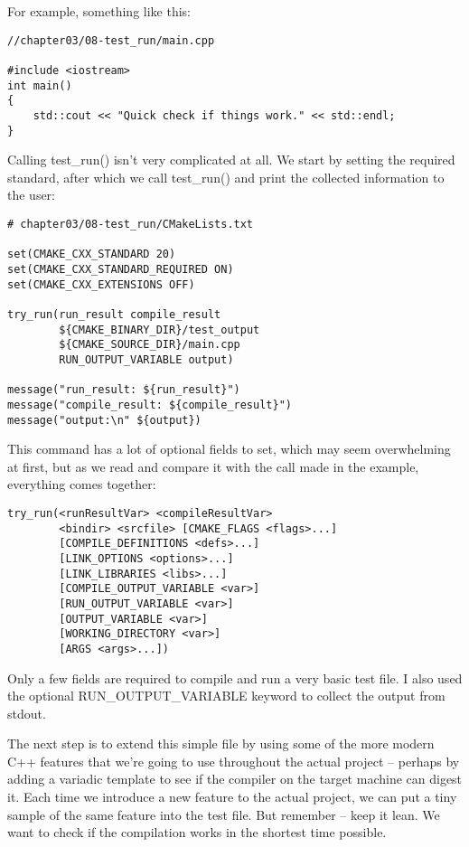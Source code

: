 For example, something like this:

\begin{lstlisting}[style=styleCXX]
//chapter03/08-test_run/main.cpp

#include <iostream>
int main()
{
	std::cout << "Quick check if things work." << std::endl;
}
\end{lstlisting}

Calling test\_run() isn't very complicated at all. We start by setting the required standard, after which we call test\_run() and print the collected information to the user:

\begin{lstlisting}[style=styleCMake]
# chapter03/08-test_run/CMakeLists.txt

set(CMAKE_CXX_STANDARD 20)
set(CMAKE_CXX_STANDARD_REQUIRED ON)
set(CMAKE_CXX_EXTENSIONS OFF)

try_run(run_result compile_result
		${CMAKE_BINARY_DIR}/test_output
		${CMAKE_SOURCE_DIR}/main.cpp
		RUN_OUTPUT_VARIABLE output)
		
message("run_result: ${run_result}")
message("compile_result: ${compile_result}")
message("output:\n" ${output})
\end{lstlisting}

This command has a lot of optional fields to set, which may seem overwhelming at first, but as we read and compare it with the call made in the example, everything comes together:

\begin{lstlisting}[style=styleCMake]
try_run(<runResultVar> <compileResultVar>
		<bindir> <srcfile> [CMAKE_FLAGS <flags>...]
		[COMPILE_DEFINITIONS <defs>...]
		[LINK_OPTIONS <options>...]
		[LINK_LIBRARIES <libs>...]
		[COMPILE_OUTPUT_VARIABLE <var>]
		[RUN_OUTPUT_VARIABLE <var>]
		[OUTPUT_VARIABLE <var>]
		[WORKING_DIRECTORY <var>]
		[ARGS <args>...])
\end{lstlisting}

Only a few fields are required to compile and run a very basic test file. I also used the optional RUN\_OUTPUT\_VARIABLE keyword to collect the output from stdout.

The next step is to extend this simple file by using some of the more modern C++ features that we're going to use throughout the actual project – perhaps by adding a variadic template to see if the compiler on the target machine can digest it. Each time we introduce a new feature to the actual project, we can put a tiny sample of the same feature into the test file. But remember – keep it lean. We want to check if the compilation works in the shortest time possible.


